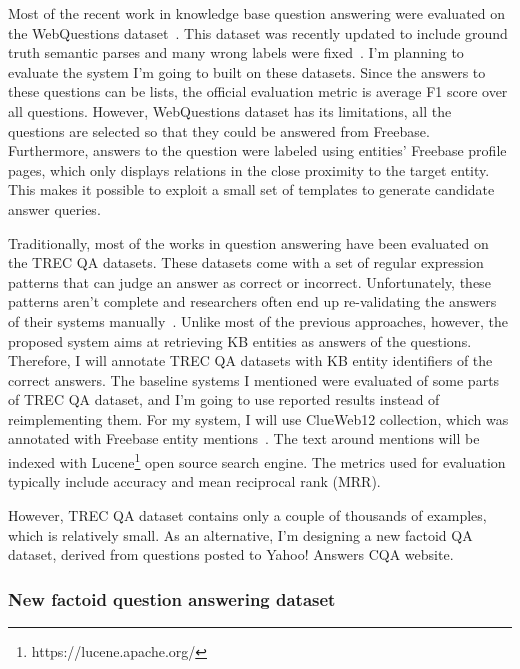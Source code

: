 Most of the recent work in knowledge base question answering were evaluated on the WebQuestions dataset~\cite{BerantCFL13:sempre}.
This dataset was recently updated to include ground truth semantic parses and many wrong labels were fixed~\cite{yih2016webquestionssp}.
I'm planning to evaluate the system I'm going to built on these datasets.
Since the answers to these questions can be lists, the official evaluation metric is average F1 score over all questions.
However, WebQuestions dataset has its limitations, \eg all the questions are selected so that they could be answered from Freebase.
Furthermore, answers to the question were labeled using entities' Freebase profile pages, which only displays relations in the close proximity to the target entity.
This makes it possible to exploit a small set of templates to generate candidate answer queries.

Traditionally, most of the works in question answering have been evaluated on the TREC QA datasets.
These datasets come with a set of regular expression patterns that can judge an answer as correct or incorrect.
Unfortunately, these patterns aren't complete and researchers often end up re-validating the answers of their systems manually~\cite{Sun:2015:ODQ:2736277.2741651,tsai2015web}.
Unlike most of the previous approaches, however, the proposed system aims at retrieving KB entities as answers of the questions.
Therefore, I will annotate TREC QA datasets with KB entity identifiers of the correct answers.
The baseline systems I mentioned were evaluated of some parts of TREC QA dataset, and I'm going to use reported results instead of reimplementing them.
For my system, I will use ClueWeb12 collection, which was annotated with Freebase entity mentions~\cite{gabrilovich2013facc1}.
The text around mentions will be indexed with Lucene\footnote{https://lucene.apache.org/} open source search engine.
The metrics used for evaluation typically include accuracy and mean reciprocal rank (MRR).

However, TREC QA dataset contains only a couple of thousands of examples, which is relatively small.
As an alternative, I'm designing a new factoid QA dataset, derived from questions posted to Yahoo! Answers CQA website.


\subsubsection{New factoid question answering dataset}
\label{section:factoid:proposal:experiments:dataset}

